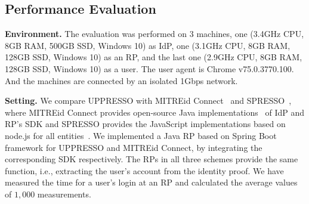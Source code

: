 \subsection{Performance Evaluation}
\label{sec:evaluation}
\noindent\textbf{Environment.} The evaluation was performed on 3 machines,
one (3.4GHz CPU, 8GB RAM, 500GB SSD, Windows 10) as IdP,
one (3.1GHz CPU, 8GB RAM, 128GB SSD, Windows 10) as an RP,
and the last one (2.9GHz CPU, 8GB RAM, 128GB SSD, Windows 10) as a user.
The user agent is Chrome v75.0.3770.100.
And the machines are connected by an isolated 1Gbps network.



\noindent\textbf{Setting.}
We compare UPPRESSO with MITREid Connect~\cite{MITREid} and SPRESSO~\cite{SPRESSO},
where MITREid Connect provides open-source Java implementations~\cite{MITREid} of IdP and RP's SDK and SPRESSO provides the JavaScript implementations based on node.js for all entities~\cite{SPRESSO}.
We implemented a Java RP based on Spring Boot framework for UPPRESSO and MITREid Connect, by integrating the corresponding SDK respectively.
The RPs in all three schemes provide the same function, i.e.,   extracting the user's account from the identity proof.
We have measured the time for a user's login at an RP and calculated the average values of $1,000$ measurements.


